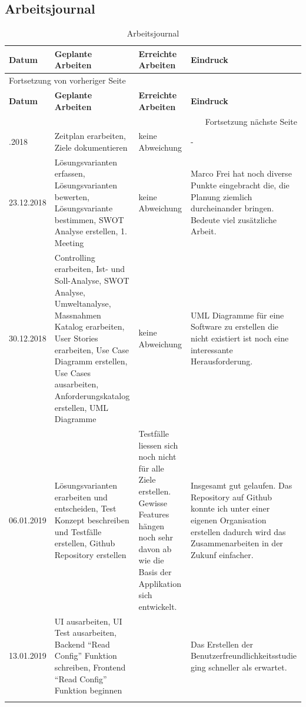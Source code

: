 \newpage
\begin{landscape}
\section{Arbeitsjournal}
\label{sec:org7205e48}

\begin{longtable}{|p{2cm}|p{5cm}|p{5cm}|p{7cm}|}
\hline
\textbf{Datum}\cellcolor[HTML]{C0C0C0} & \textbf{Geplante Arbeiten}\cellcolor[HTML]{C0C0C0} & \textbf{Erreichte Arbeiten}\cellcolor[HTML]{C0C0C0} & \textbf{Eindruck}\cellcolor[HTML]{C0C0C0}\\
\hline
\endfirsthead
\multicolumn{4}{l}{Fortsetzung von vorheriger Seite} \\
\hline

\textbf{Datum}\cellcolor[HTML]{C0C0C0} & \textbf{Geplante Arbeiten}\cellcolor[HTML]{C0C0C0} & \textbf{Erreichte Arbeiten}\cellcolor[HTML]{C0C0C0} & \textbf{Eindruck}\cellcolor[HTML]{C0C0C0} \\

\hline
\endhead
\hline\multicolumn{4}{r}{Fortsetzung nächste Seite} \\
\endfoot
\endlastfoot
\hline
16.12.2018 & Zeitplan erarbeiten, Ziele dokumentieren & keine Abweichung & -\\
\hline
23.12.2018 & Lösungsvarianten erfassen, Lösungsvarianten bewerten, Lösungsvariante bestimmen, SWOT Analyse erstellen, 1. Meeting & keine Abweichung & Marco Frei hat noch diverse Punkte eingebracht die, die Planung ziemlich durcheinander bringen. Bedeute viel zusätzliche Arbeit.\\
\hline
30.12.2018 & Controlling erarbeiten, Ist- und Soll-Analyse, SWOT Analyse, Umweltanalyse, Massnahmen Katalog erarbeiten, User Stories erarbeiten, Use Case Diagramm erstellen, Use Cases ausarbeiten, Anforderungskatalog erstellen, UML Diagramme & keine Abweichung & UML Diagramme für eine Software zu erstellen die nicht existiert ist noch eine interessante Herausforderung.\\
\hline
06.01.2019 & Lösungsvarianten erarbeiten und entscheiden, Test Konzept beschreiben und Testfälle erstellen, Github Repository erstellen & Testfälle liessen sich noch nicht für alle Ziele erstellen. Gewisse Features hängen noch sehr davon ab wie die Basis der Applikation sich entwickelt. & Insgesamt gut gelaufen. Das Repository auf Github konnte ich unter einer eigenen Organisation erstellen dadurch wird das Zusammenarbeiten in der Zukunf einfacher.\\
\hline
13.01.2019 & UI ausarbeiten, UI Test ausarbeiten, Backend "`Read Config"' Funktion schreiben, Frontend "`Read Config"'  Funktion beginnen &  & Das Erstellen der Benutzerfreundlichkeitsstudie ging schneller als erwartet.\\
\hline
\caption{\label{tab:orgf1596d1}
Arbeitsjournal}
\\
\end{longtable}
\end{landscape}
